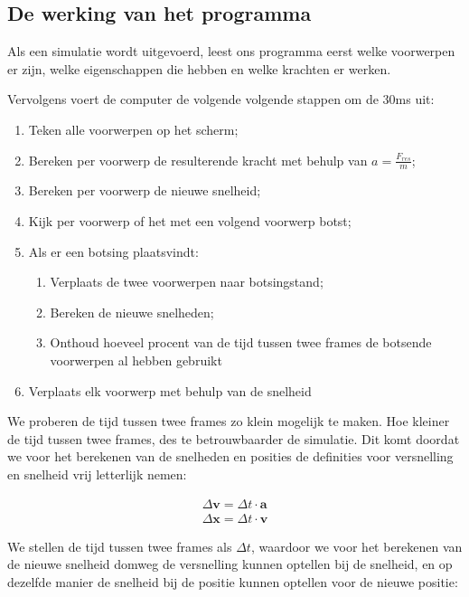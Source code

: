\documentclass[12pt,a4paper]{article}
\begin{document}
	\subsection{De werking van het programma}
	\label{werking-van-het-programma}
	Als een simulatie wordt uitgevoerd, leest ons programma eerst welke voorwerpen er zijn, welke eigenschappen die hebben en welke krachten er werken.
	
	Vervolgens voert de computer de volgende volgende stappen om de 30ms uit: 
	
	\begin{enumerate}
		\item Teken alle voorwerpen op het scherm;
		\item Bereken per voorwerp de resulterende kracht met behulp van $a = \tfrac{F_{res}}{m}$;
		\item Bereken per voorwerp de nieuwe snelheid;
		\item Kijk per voorwerp of het met een volgend voorwerp botst;
		\item Als er een botsing plaatsvindt:
			\begin{enumerate}
				\item Verplaats de twee voorwerpen naar botsingstand;
				\item Bereken de nieuwe snelheden;
				\item Onthoud hoeveel procent van de tijd tussen twee frames de botsende voorwerpen al hebben gebruikt
			\end{enumerate}
		\item Verplaats elk voorwerp met behulp van de snelheid
	\end{enumerate}
	
	We proberen de tijd tussen twee frames zo klein mogelijk te maken. Hoe kleiner de tijd tussen twee frames, des te betrouwbaarder de simulatie. Dit komt doordat we voor het berekenen van de snelheden en posities de definities voor versnelling en snelheid vrij letterlijk nemen:
	
	\begin{equation}
		\begin{aligned}
			\Delta \mathbf{v} = \Delta t \cdot \mathbf{a} \\
			\Delta \mathbf{x} = \Delta t \cdot \mathbf{v}
		\end{aligned}
	\end{equation}
	
	We stellen de tijd tussen twee frames als $\Delta t$, waardoor we voor het berekenen van de nieuwe snelheid domweg de versnelling kunnen optellen bij de snelheid, en op dezelfde manier de snelheid bij de positie kunnen optellen voor de nieuwe positie:
	
\end{document}
